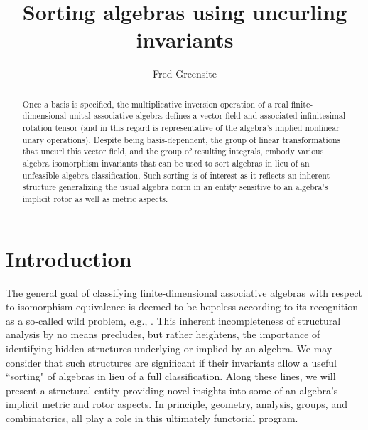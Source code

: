 \documentclass{amsart}
\numberwithin{equation}{section}
\theoremstyle{definition}
\numberwithin{theorem}{section}
\begin{document}
       
             \title{Sorting algebras using uncurling invariants}
    \author{Fred Greensite}
    
   \begin{abstract} Once a basis is specified, the multiplicative inversion operation of a real finite-dimensional unital associative algebra defines a vector field and associated infinitesimal rotation tensor (and in this regard is representative of the algebra's implied nonlinear unary operations).  Despite being basis-dependent, the group of linear transformations that uncurl this vector field, and the group of resulting integrals, embody various algebra isomorphism invariants that can be used to sort algebras in lieu of an unfeasible algebra classification.  Such sorting is of interest as it reflects an inherent structure generalizing the usual algebra norm in an entity sensitive to an algebra's implicit rotor as well as metric aspects.  \end{abstract}
        
  \maketitle
  
 \tableofcontents
 
 \section{Introduction} The general goal of classifying finite-dimensional associative algebras with respect to isomorphism equivalence is deemed to be hopeless according to its recognition as a so-called wild problem, e.g., \cite{eom:2024,drozd:1972,belitskii:2005}.   This inherent incompleteness of structural analysis by no means precludes, but rather heightens, the importance of identifying hidden structures underlying or implied by an algebra.  We may consider that such structures are significant if their invariants allow a useful ``sorting" of algebras in lieu of a full classification.   Along these lines, we will present a structural entity providing novel insights into some of an algebra's implicit metric and rotor aspects.  In principle, geometry, analysis, groups, and combinatorics, all play a role in this ultimately functorial program.
 

 \bigskip
 
\end{document}
